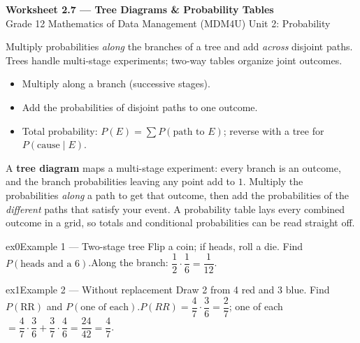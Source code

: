 \documentclass[11pt]{article}
\begin{document}
\begin{center}
{\LARGE\bfseries\color{titleblue}Worksheet 2.7 --- Tree Diagrams \& Probability Tables}\\[2pt]
{\small Grade 12 Mathematics of Data Management (MDM4U) \textperiodcentered{} Unit 2: Probability}
\end{center}

\begin{ideabox}
Multiply probabilities \emph{along} the branches of a tree and add \emph{across} disjoint paths. Trees handle multi-stage experiments; two-way tables organize joint outcomes.
\begin{itemize}[leftmargin=*,itemsep=2pt]
  \item Multiply along a branch (successive stages).
  \item Add the probabilities of disjoint paths to one outcome.
  \item Total probability: $P(E)=\sum P(\text{path to }E)$; reverse with a tree for $P(\text{cause}\mid E)$.
\end{itemize}
\end{ideabox}

\begin{learnbox}
A \textbf{tree diagram} maps a multi-stage experiment: every branch is an outcome, and the branch probabilities leaving any point add to $1$.
Multiply the probabilities \emph{along} a path to get that outcome, then add the probabilities of the \emph{different} paths that satisfy your event.
A probability table lays every combined outcome in a grid, so totals and conditional probabilities can be read straight off.
\end{learnbox}


\begin{example}{ex0}{Example 1 --- Two-stage tree}
Flip a coin; if heads, roll a die. Find $P(\text{heads and a 6})$.\soln Along the branch: $\dfrac12\cdot\dfrac16=\dfrac{1}{12}$.
\end{example}

\begin{example}{ex1}{Example 2 --- Without replacement}
Draw 2 from 4 red and 3 blue. Find $P(\text{RR})$ and $P(\text{one of each})$.\soln $P(RR)=\dfrac47\cdot\dfrac36=\dfrac27$; one of each $=\dfrac47\cdot\dfrac36+\dfrac37\cdot\dfrac46=\dfrac{24}{42}=\dfrac47$.
\end{example}
\end{document}
